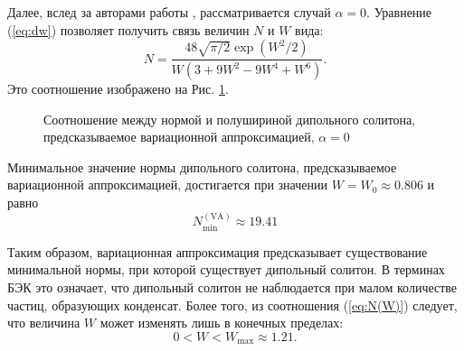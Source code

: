 Далее, вслед за авторами работы \cite{Malomed}, рассматривается случай $\alpha = 0$.
Уравнение (\ref{eq:dw}) позволяет получить связь величин $N$ и $W$ вида:
%
\begin{equation}
N=\frac{48\sqrt{\pi /2}\exp \left( W^{2}/2\right) }{W\left(3+9W^{2}-9W^{4}+W^{6}\right) }.
\label{eq:N(W)}
\end{equation}
%
Это соотношение изображено на Рис. \ref{pic:N(W)}.
%
\begin{figure}
\caption{Соотношение между нормой и полушириной дипольного солитона, предсказываемое вариационной аппроксимацией, $\alpha = 0$}
\label{pic:N(W)}
\end{figure}
%
Минимальное значение нормы дипольного солитона, предсказываемое вариационной аппроксимацией, достигается при значении $W = W_0 \approx 0.806$ и равно
%
\begin{equation}
N_{\mathrm{min}}^{\mathrm{(VA)}} \approx 19.41
\label{eq:norm_min_va}
\end{equation}
%

Таким образом, вариационная аппроксимация предсказывает существование минимальной нормы, при которой существует дипольный солитон.
В терминах БЭК это означает, что дипольный солитон не наблюдается при малом количестве частиц, образующих конденсат.
Более того, из соотношения (\ref{eq:N(W)}) следует, что величина $W$ может изменять лишь в конечных пределах:
%
\begin{equation}
0 < W < W_{\mathrm{max}} \approx 1.21.
\end{equation}
%

